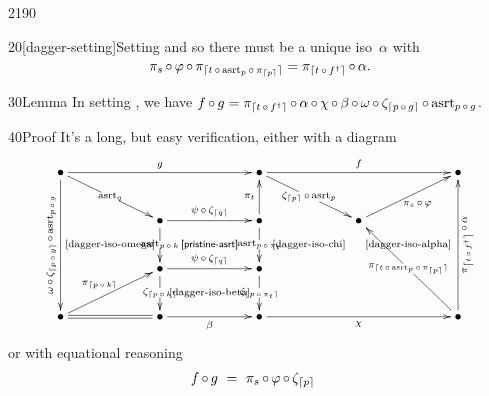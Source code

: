 \begin{parsec}{2190}
\begin{point}{20}[dagger-setting]{Setting}
and so there must be a unique iso~$\alpha$ with
\begin{equation}\label{dagger-iso-alpha}
    \pi_s \mathop{\circ} \varphi \mathop{\circ} \pi_{\lceil t \mathop{\circ} \mathrm{asrt}_p \mathop{\circ}
    \pi_{\left\lceil p\right\rceil} \rceil} = \pi_{\left\lceil t \mathop{\circ} f^\dagger\right\rceil} \mathop{\circ} \alpha.
\end{equation}
\end{point}
\spacingfix{}
\begin{point}{30}{Lemma}%
In setting , we have
    $f \mathop{\circ} g  =  \pi_{\left\lceil t \mathop{\circ} f^\dagger\right\rceil}
        \mathop{\circ} \alpha \mathop{\circ} \chi \mathop{\circ} \beta \mathop{\circ} \omega
        \mathop{\circ} \zeta_{\left\lceil p \mathop{\circ} g\right\rceil} \mathop{\circ}
        \mathrm{asrt}_{p \mathop{\circ} g}$.
\begin{point}{40}{Proof}%
It's a long, but easy verification,
    either with a diagram
\begin{equation*}
    \xymatrix@C+3pc {
        \bullet \ar[rr]^g
        \ar[rd]|{\asrt_q}
        \ar[ddd]_{\rotatebox{90}{$\scriptstyle\omega\after\zeta_{\ceil{p \after g}} \after \asrt_{p \after g}$}}
        && \bullet \ar[rr]^f
            \ar[rd]|{\zeta_{\ceil{p}}\after \asrt_p}
        && \bullet
            \\ \ar@{}[rd]|{\text{\eqref{dagger-iso-omega}}}
            & \bullet
                \ar[r]^{\psi \after \zeta_{\ceil{q}}}
                \ar[d]|{\asrt_{p \after k}}
                \ar@{}[rd]|{\text{\sref{pristine-asrt}}}
 & \bullet
            \ar[u]^{\pi_t}
            \ar[d]|{\asrt_{p \after \pi_t}}
            & \bullet \ar[ru]_{\pi_s\after\varphi}
            \ar@{}[rd]|{\text{\eqref{dagger-iso-alpha}}}
            \\& \bullet \ar[r]^{\psi \after \zeta_{\ceil{q}}}
                        \ar[d]|{\zeta_{\ceil{p \after k}}}
                \ar@{}[rd]|{\text{\eqref{dagger-iso-beta}}}
            &\bullet \ar[d]|{\zeta_{\ceil{p \after \pi_t}}}
                        \ar@{}[ru]|{\text{\eqref{dagger-iso-chi}}}
                        &&
            \\ \bullet \ar@{=}[r]
            \ar[ru]^{\pi_{\ceil{p \after k}}}
            &\bullet \ar[r]_\beta
            &\bullet \ar[rr]_\chi
            &&\bullet \ar[uuu]_{\rotatebox{90}{$\scriptstyle\pi_{\ceil{t \after f^\dagger}} \after \alpha$}}
                        \ar[luu]|{\pi_{\lceil t \after \asrt_p \after \pi_{\ceil{p}} \rceil}}
        }
\end{equation*}
or with equational reasoning
\begin{align*}
   f \after g
    & \ = \ \pi_s \after \varphi \after \zeta_{\ceil{p}}

\end{align*}
\end{point}
\end{point}
\end{parsec}
